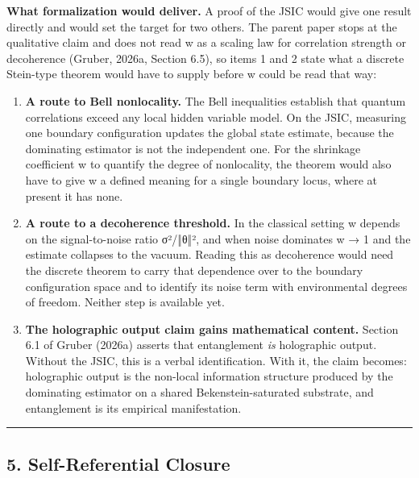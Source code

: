 \documentclass[
]{article}
\begin{document}
\textbf{What formalization would deliver.} A proof of the JSIC would
give one result directly and would set the target for two others. The
parent paper stops at the qualitative claim and does not read w as a
scaling law for correlation strength or decoherence (Gruber, 2026a,
Section 6.5), so items 1 and 2 state what a discrete Stein-type theorem
would have to supply before w could be read that way:

\begin{enumerate}
\def\labelenumi{\arabic{enumi}.}
\item
  \textbf{A route to Bell nonlocality.} The Bell inequalities establish
  that quantum correlations exceed any local hidden variable model. On
  the JSIC, measuring one boundary configuration updates the global
  state estimate, because the dominating estimator is not the
  independent one. For the shrinkage coefficient w to quantify the
  degree of nonlocality, the theorem would also have to give w a defined
  meaning for a single boundary locus, where at present it has none.
\item
  \textbf{A route to a decoherence threshold.} In the classical setting
  w depends on the signal-to-noise ratio σ²/‖θ‖², and when noise
  dominates w → 1 and the estimate collapses to the vacuum. Reading this
  as decoherence would need the discrete theorem to carry that
  dependence over to the boundary configuration space and to identify
  its noise term with environmental degrees of freedom. Neither step is
  available yet.
\item
  \textbf{The holographic output claim gains mathematical content.}
  Section 6.1 of Gruber (2026a) asserts that entanglement \emph{is}
  holographic output. Without the JSIC, this is a verbal identification.
  With it, the claim becomes: holographic output is the non-local
  information structure produced by the dominating estimator on a shared
  Bekenstein-saturated substrate, and entanglement is its empirical
  manifestation.
\end{enumerate}

\begin{center}\rule{0.5\linewidth}{0.5pt}\end{center}

\hypertarget{self-referential-closure}{%
\subsection{5. Self-Referential
Closure}\label{self-referential-closure}}
\end{document}
